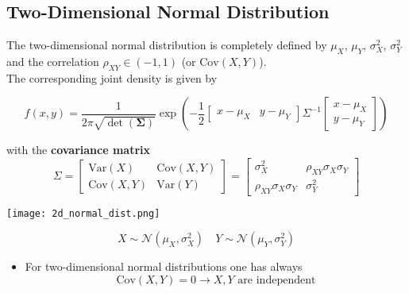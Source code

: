\subsection{Two-Dimensional Normal Distribution}
The two-dimensional normal distribution is completely defined by $\mu_X$, $\mu_Y$, $\sigma_X^2$, $\sigma_Y^2$ and the correlation $\rho_{XY}\in(-1,1)$ (or $\mathrm{Cov}(X,Y)$).\\
The corresponding joint density is given by
\begin{footnotesize}
    \noindent\begin{equation*}
        f(x,y) = \frac{1}{2\pi\sqrt{\det(\bm{\Sigma})}}\exp\left(-\frac{1}{2}\begin{bmatrix}x-\mu_X & y-\mu_Y\end{bmatrix}\Sigma^{-1}\begin{bmatrix}x-\mu_X \\ y-\mu_Y \end{bmatrix}\right)
    \end{equation*}
\end{footnotesize}
with the \textbf{covariance matrix}
\begin{equation*}
    \Sigma = \begin{bmatrix}
        \mathrm{Var}(X)   & \mathrm{Cov}(X,Y) \\
        \mathrm{Cov}(X,Y) & \mathrm{Var}(Y)
    \end{bmatrix}
    =
    \begin{bmatrix}
        \sigma_X^2                & \rho_{XY}\sigma_X\sigma_Y \\
        \rho_{XY}\sigma_X\sigma_Y & \sigma_Y^2
    \end{bmatrix}
\end{equation*}

\begin{center}
    \texttt{[image: 2d\_normal\_dist.png]}
\end{center}

\newpar{}
\begin{equation*}
    X \sim\mathcal{N}(\mu_X, \sigma_X^2) \quad Y \sim\mathcal{N}(\mu_Y, \sigma_Y^2)
\end{equation*}


\begin{itemize}
    \item For two-dimensional normal distributions one has always
          \begin{equation*}
              \mathrm{Cov}(X,Y)=0 \rightarrow X, Y \text{ are independent}
          \end{equation*}
\end{itemize}

